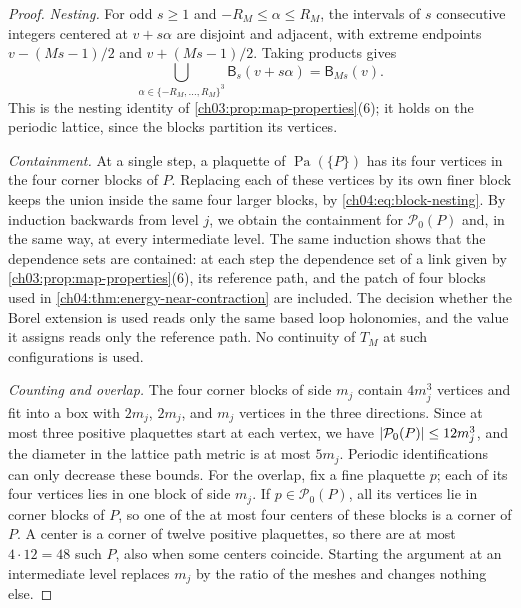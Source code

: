 \begin{proof}
\emph{Nesting.} For odd $s\ge1$ and $-R_M\le\alpha\le R_M$, the intervals of $s$ consecutive integers centered at $v+s\alpha$ are disjoint and adjacent, with extreme endpoints $v-(Ms-1)/2$ and $v+(Ms-1)/2$. Taking products gives
\begin{equation}\label{ch04:eq:block-nesting}
 \bigcup_{\alpha\in\{-R_M,\dots,R_M\}^3}\mathsf B_s(v+s\alpha)=\mathsf B_{Ms}(v).
\end{equation}
This is the nesting identity of \cref{ch03:prop:map-properties}(6); it holds on the periodic lattice, since the blocks partition its vertices.

\emph{Containment.} At a single step, a plaquette of $\operatorname{Pa}(\{P\})$ has its four vertices in the four corner blocks of $P$. Replacing each of these vertices by its own finer block keeps the union inside the same four larger blocks, by \eqref{ch04:eq:block-nesting}. By induction backwards from level $j$, we obtain the containment for $\mathcal P_0(P)$ and, in the same way, at every intermediate level. The same induction shows that the dependence sets are contained: at each step the dependence set of a link given by \cref{ch03:prop:map-properties}(6), its reference path, and the patch of four blocks used in \cref{ch04:thm:energy-near-contraction} are included. The decision whether the Borel extension is used reads only the same based loop holonomies, and the value it assigns reads only the reference path. No continuity of $T_M$ at such configurations is used.

\emph{Counting and overlap.} The four corner blocks of side $m_j$ contain $4m_j^3$ vertices and fit into a box with $2m_j$, $2m_j$, and $m_j$ vertices in the three directions. Since at most three positive plaquettes start at each vertex, we have $\lvert \mathcal P_0(P)\rvert\le12m_j^3$, and the diameter in the lattice path metric is at most $5m_j$. Periodic identifications can only decrease these bounds. For the overlap, fix a fine plaquette $p$; each of its four vertices lies in one block of side $m_j$. If $p\in\mathcal P_0(P)$, all its vertices lie in corner blocks of $P$, so one of the at most four centers of these blocks is a corner of $P$. A center is a corner of twelve positive plaquettes, so there are at most $4\cdot12=48$ such $P$, also when some centers coincide. Starting the argument at an intermediate level replaces $m_j$ by the ratio of the meshes and changes nothing else.


\end{proof}
